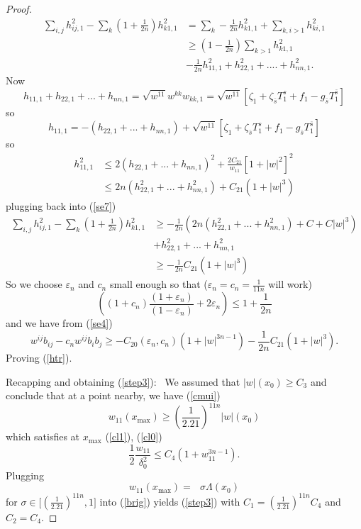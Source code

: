 \documentclass[11pt,letterpaper]{amsart}%
\numberwithin{equation}{section}
\begin{document}
\begin{proof}
\begin{align}
\sum_{i,j}h_{ij,1}^{2}-\sum_{k}\left(  1+\frac{1}{2n}\right)  h_{k1,1}^{2}  &
=\sum_{k}-\frac{1}{2n}h_{k1,1}^{2}+\sum_{k,i>1}h_{ki,1}^{2}\label{se7}\\
&  \geq(1-\frac{1}{2n})\sum_{k>1}h_{k1,1}^{2}\nonumber\\
&  -\frac{1}{2n}h_{11,1}^{2}+h_{22,1}^{2}+....+h_{nn,1}^{2}.\nonumber
\end{align}
Now
\[
h_{11,1}+h_{22,1}+...+h_{nn,1}=\sqrt{w^{11}}w^{kk}w_{kk,1}=\sqrt{w^{11}%
}\left[  \zeta_{1}+\zeta_{\bar{s}}T_{1}^{s}+f_{1}-g_{\bar{s}}T_{1}^{\bar{s}%
}\right]
\]
so
\[
h_{11,1}=-\left(  h_{22,1}+...+h_{nn,1}\right)  +\sqrt{w^{11}}\left[
\zeta_{1}+\zeta_{\bar{s}}T_{1}^{s}+f_{1}-g_{\bar{s}}T_{1}^{\bar{s}}\right]
\]
so
\begin{align*}
h_{11,1}^{2}  &  \leq2\left(  h_{22,1}+...+h_{nn,1}\right)  ^{2}+\frac
{2C_{21}}{w_{11}}\left[  1+\left\vert w\right\vert ^{2}\right]  ^{2}\\
&  \leq2n\left(  h_{22,1}^{2}+...+h_{nn,1}^{2}\right)  +C_{21}(1+\left\vert
w\right\vert ^{3})
\end{align*}
plugging back into (\ref{se7})
\begin{align*}
\sum_{i,j}h_{ij,1}^{2}-\sum_{k}\left(  1+\frac{1}{2n}\right)  h_{k1,1}^{2} &
\geq-\frac{1}{2n}\left(  2n\left(  h_{22,1}^{2}+...+h_{nn,1}^{2}\right)
+C+C\left\vert w\right\vert ^{3}\right)  \\
&  +h_{22,1}^{2}+...+h_{nn,1}^{2}\\
&  \geq-\frac{1}{2n}C_{21}(1+\left\vert w\right\vert ^{3})
\end{align*}
So we choose $\varepsilon_{n}$ and $c_{n}$ small enough so that ($\varepsilon
_{n}=c_{n}=\frac{1}{11n}$ will work)
\[
\left(  (1+c_{n})\frac{\left(  1+\varepsilon_{n}\right)  }{(1-\varepsilon
_{n})}+2\varepsilon_{n}\right)  \leq1+\frac{1}{2n}%
\]
and we have from (\ref{se4})
\[
w^{ij}b_{ij}-c_{n}w^{ij}b_{i}b_{j}\geq-C_{20}(\varepsilon_{n},c_{n}%
)(1+\left\vert w\right\vert ^{3n-1})-\frac{1}{2n}C_{21}(1+\left\vert
w\right\vert ^{3}).
\]
Proving (\ref{htr}). \ 

Recapping and obtaining (\ref{step3}): \ We assumed that $\left\vert
w\right\vert (x_{0})\geq C_{3}$ and conclude that at a point nearby, we have
(\ref{cmui})
\[
w_{11}(x_{\max})\geq\left(  \frac{1}{2.21}\right)  ^{11n}\left\vert
w\right\vert (x_{0})
\]
which satisfies at $x_{\max}$ (\ref{cl1}), (\ref{cl0})
\begin{equation}
\frac{1}{2}\frac{w_{11}}{\delta_{0}^{2}}\leq C_{4}(1+w_{11}^{3n-1}).
\label{brig}%
\end{equation}
Plugging
\[
w_{11}(x_{\max})=\text{ }\sigma\Lambda(x_{0})
\]
for $\sigma\in\lbrack\left(  \frac{1}{2.21}\right)  ^{11n},1]$ into
(\ref{brig}) yields (\ref{step3}) with $C_{1}=\left(  \frac{1}{2.21}\right)
^{11n}C_{4}$ and $C_{2}=C_{4}.$

\end{proof}
\end{document}

